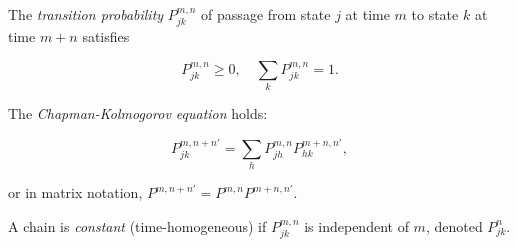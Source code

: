 The \textit{transition probability} $P_{jk}^{m,n}$ of passage from state $j$ at time $m$ to state $k$ at time $m + n$ satisfies

$$P_{jk}^{m,n} \geq 0, \quad \sum_k P_{jk}^{m,n} = 1.$$

The \textit{Chapman-Kolmogorov equation} holds:

$$P_{jk}^{m,n+n'} = \sum_h P_{jh}^{m,n} P_{hk}^{m+n,n'},$$

or in matrix notation, $P^{m,n+n'} = P^{m,n} P^{m+n,n'}$.

A chain is \textit{constant} (time-homogeneous) if $P_{jk}^{m,n}$ is independent of $m$, denoted $P_{jk}^n$.
